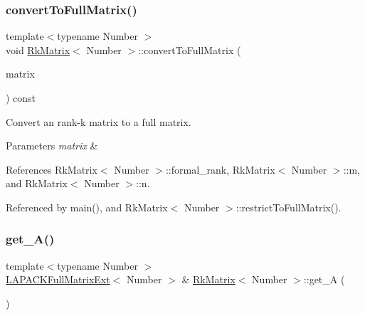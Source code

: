 \mbox{\label{classRkMatrix_a384cdf3033d98f90b80d373add20b556}} 
\subsubsection{\texorpdfstring{convert\+To\+Full\+Matrix()}{convertToFullMatrix()}}
{\footnotesize\ttfamily template$<$typename Number $>$ \\
void \hyperlink{classRkMatrix}{Rk\+Matrix}$<$ Number $>$\+::convert\+To\+Full\+Matrix (\begin{DoxyParamCaption}\item[{\hyperlink{classLAPACKFullMatrixExt}{L\+A\+P\+A\+C\+K\+Full\+Matrix\+Ext}$<$ Number $>$ \&}]{matrix }\end{DoxyParamCaption}) const}

Convert an rank-\/k matrix to a full matrix. 
\begin{DoxyParams}{Parameters}
{\em matrix} & \\
\hline
\end{DoxyParams}


References Rk\+Matrix$<$ Number $>$\+::formal\+\_\+rank, Rk\+Matrix$<$ Number $>$\+::m, and Rk\+Matrix$<$ Number $>$\+::n.



Referenced by main(), and Rk\+Matrix$<$ Number $>$\+::restrict\+To\+Full\+Matrix().

\mbox{\label{classRkMatrix_accfea435fd26c622e491bee475ae788c}} 
\subsubsection{\texorpdfstring{get\+\_\+\+A()}{get\_A()}\hspace{0.1cm}{\footnotesize\ttfamily [1/2]}}
{\footnotesize\ttfamily template$<$typename Number $>$ \\
\hyperlink{classLAPACKFullMatrixExt}{L\+A\+P\+A\+C\+K\+Full\+Matrix\+Ext}$<$ Number $>$ \& \hyperlink{classRkMatrix}{Rk\+Matrix}$<$ Number $>$\+::get\+\_\+A (\begin{DoxyParamCaption}{ }\end{DoxyParamCaption})}


